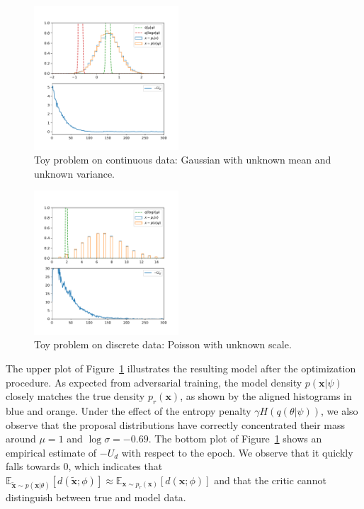 \documentclass[twocolumn,superscriptaddress,aps]{revtex4-1}
\theoremstyle{plain}
\begin{document}
\begin{figure}
    \centering
    \vspace{-0.8cm}
    \includegraphics[width=0.48\textwidth]{figures/gaussian-gamma=5.pdf}
    \vspace{-1cm}
    \caption{Toy problem on continuous data: Gaussian with unknown mean and unknown variance.}\label{fig:gaussian}
\end{figure}
\begin{figure}
    \centering
    \vspace{-0.8cm}
    \includegraphics[width=0.48\textwidth]{figures/poisson-gamma=5.pdf}
    \vspace{-1cm}
    \caption{Toy problem on discrete data: Poisson with unknown scale.}\label{fig:poisson}
\end{figure}

The upper plot of Figure~\ref{fig:gaussian} illustrates the resulting model
after the optimization procedure. As expected from adversarial training, the
model density $p(\mathbf{x}|\psi)$ closely matches the true density
$p_r(\mathbf{x})$, as shown by the aligned histograms in blue and orange. Under
the effect of the entropy penalty $\gamma H(q(\theta|\psi))$, we also observe
that the proposal distributions have correctly concentrated their mass around
$\mu=1$ and $\log \sigma=-0.69$. The bottom plot of Figure~\ref{fig:gaussian}
shows an empirical estimate of $-U_d$ with respect to the epoch. We observe
that it quickly falls towards $0$, which indicates that
$\mathbb{E}_{\tilde{\mathbf{x}} \sim p(\mathbf{x}|\theta)} [d(\tilde{\mathbf{x}};\phi)] \approx \mathbb{E}_{\mathbf{x} \sim p_r(\mathbf{x})} [d(\mathbf{x};\phi)]$
and that the critic cannot distinguish between true and model data.
\end{document}
